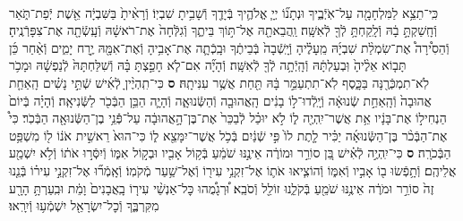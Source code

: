 \documentclass[twoside, openany, parskip=half, 11pt]{book}
\begin{document}
\begin{footnotesize}
\begin{multicols}{2}
\\
כִּֽי־תֵצֵ֥א לַמִּלְחָמָ֖ה עַל־אֹֽיְֿבֶ֑יךָ וּנְתָנ֞וֹ יְיָ֧ אֱלֹהֶ֛יךָ בְּֿיָדֶ֖ךָ וְֿשָׁבִ֥יתָ שִׁבְיֽוֹ׃ וְֿרָאִ֨יתָ֙ בַּשִּׁבְיָ֔ה אֵ֖שֶׁת יְֿפַת־תֹּ֑אַר וְֿחָֽשַׁקְתָּ֣ בָ֔הּ וְֿלָֽקַחְתָּ֥ לְֿךָ֖ לְֿאִשָּֽׁה׃ וַֽהֲבֵאתָ֖הּ אֶל־תּ֣וֹךְ בֵּיתֶ֑ךָ וְֿגִלְּֿחָה֙ אֶת־רֹאשָׁ֔הּ וְֿעָֽשְֿׂתָ֖ה אֶת־צִפָּרְֿנֶֽיהָ׃ וְֿהֵסִ֩ירָה֩ אֶת־שִׂמְלַ֨ת שִׁבְיָ֜הּ מֵֽעָלֶ֗יהָ וְֿיָֽשְֿׁבָה֙ בְּֿבֵיתֶ֔ךָ וּבָֽכְֿתָ֛ה אֶת־אָבִ֥יהָ וְֿאֶת־אִמָּ֖הּ יֶ֣רַח יָמִ֑ים וְֿאַ֨חַר כֵּ֜ן תָּב֤וֹא אֵלֶ֨יהָ֙ וּֽבְעַלְתָּ֔הּ וְֿהָֽיְֿתָ֥ה לְֿךָ֖ לְֿאִשָּֽׁה׃ וְֿהָיָ֞ה אִם־לֹ֧א חָפַ֣צְתָּ בָּ֗הּ וְֿשִׁלַּחְתָּהּ֙ לְֿנַפְשָׁ֔הּ וּמָכֹ֥ר לֹֽא־תִמְכְּֿרֶ֖נָּה בַּכָּ֑סֶף לֹֽא־תִתְעַמֵּ֣ר בָּ֔הּ תַּ֖חַת אֲשֶׁ֥ר עִנִּיתָֽהּ׃ \textbf{ס}
כִּי־תִֽהְיֶ֨יןָ לְֿאִ֜ישׁ שְֿׁתֵּ֣י נָשִׁ֗ים הָֽאַחַ֤ת אֲהוּבָה֙ וְֿהָֽאַחַ֣ת שְֿׂנוּאָ֔ה וְֿיָֽלְֿדוּ־ל֣וֹ בָנִ֔ים הָֽאֲהוּבָ֖ה וְֿהַשְּֿׂנוּאָ֑ה וְֿהָיָ֛ה הַבֵּ֥ן הַבְּֿכֹ֖ר לַשְּֿׂנִיאָֽה׃ וְֿהָיָ֗ה בְּֿיוֹם֙ הַנְחִיל֣וֹ אֶת־בָּנָ֔יו אֵ֥ת אֲשֶׁר־יִֽהְיֶ֖ה ל֑וֹ לֹ֣א יוּכַ֗ל לְֿבַכֵּר֙ אֶת־בֶּן־הָ֣אֲהוּבָ֔ה עַל־פְּֿֿנֵ֥י בֶן־הַשְּֿׂנוּאָ֖ה הַבְּֿכֹֽר׃ כִּי֩ אֶת־הַבְּֿכֹ֨ר בֶּן־הַשְּֿׂנוּאָ֜ה יַכִּ֗יר לָ֤תֶת לוֹ֙ פִּ֣י שְֿׁנַ֔יִם בְּֿכֹ֥ל אֲשֶׁר־יִמָּצֵ֖א ל֑וֹ כִּי־הוּא֙ רֵאשִׁ֣ית אֹנ֔וֹ ל֖וֹ מִשְׁפַּ֥ט הַבְּֿכֹרָֽה׃ \textbf{ס}
כִּי־יִֽהְיֶ֣ה לְֿאִ֗ישׁ בֵּ֚ן סוֹרֵ֣ר וּמוֹרֶ֔ה אֵינֶ֣נּוּ שֹׁמֵ֔עַ בְּֿק֥וֹל אָבִ֖יו וּבְק֣וֹל אִמּ֑וֹ וְֿיִסְּֿר֣וּ אֹת֔וֹ וְֿלֹ֥א יִשְׁמַ֖ע אֲלֵיהֶֽם׃ וְֿתָ֥פְֿשׂוּ ב֖וֹ אָבִ֣יו וְֿאִמּ֑וֹ וְֿהוֹצִ֧יאוּ אֹת֛וֹ אֶל־זִקְנֵ֥י עִיר֖וֹ וְֿאֶל־שַׁ֥עַר מְֿקֹמֽוֹ׃ וְֿאָֽמְֿר֞וּ אֶל־זִקְנֵ֣י עִיר֗וֹ בְּֿנֵ֤נוּ זֶה֙ סוֹרֵ֣ר וּמֹרֶ֔ה אֵינֶ֥נּוּ שֹׁמֵ֖עַ בְּֿקֹלֵ֑נוּ זוֹלֵ֖ל וְֿסֹבֵֽא׃ וּ֠רְגָמֻ֠הוּ כׇּל־אַנְשֵׁ֨י עִיר֤וֹ בָֽאֲבָנִים֙ וָמֵ֔ת וּבִֽעַרְתָּ֥ הָרָ֖ע מִקִּרְבֶּ֑ךָ וְֿכׇל־יִשְׂרָאֵ֖ל יִשְׁמְֿע֥וּ וְֿיִרָֽאוּ׃


\end{multicols}
\end{footnotesize}
\end{document}
